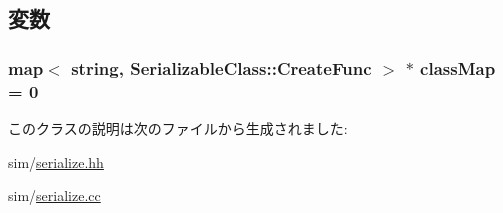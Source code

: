 \subsection{変数}
\hypertarget{classSerializableClass_a9f05a150a55145281d93afd0119f2192}{
\subsubsection[{classMap}]{\setlength{\rightskip}{0pt plus 5cm}map$<$ string, {\bf SerializableClass::CreateFunc} $>$ $\ast$ {\bf classMap} = 0}}
\label{classSerializableClass_a9f05a150a55145281d93afd0119f2192}


このクラスの説明は次のファイルから生成されました:\begin{DoxyCompactItemize}
\item 
sim/\hyperlink{serialize_8hh}{serialize.hh}\item 
sim/\hyperlink{serialize_8cc}{serialize.cc}\end{DoxyCompactItemize}
